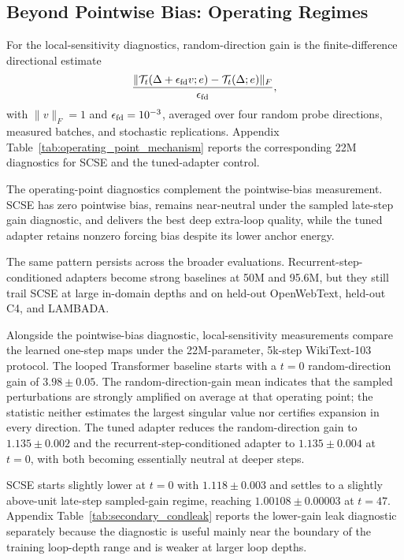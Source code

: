 \documentclass[letterpaper]{article} %
\newcommand{\SCSE}{\textsc{SCSE}}
\newcommand{\norm}[1]{\lVert#1\rVert}
\newcommand{\Tmap}{\mathcal{T}}
\theoremstyle{remark}
\begin{document}
\subsection{Beyond Pointwise Bias: Operating Regimes}
\label{app:after-bias-removal}

For the local-sensitivity diagnostics, random-direction gain is the finite-difference directional estimate
\begin{align*}
	\frac{\norm{\Tmap_t(\Delta+\epsilon_{\rm fd} v;e)-\Tmap_t(\Delta;e)}_F}{\epsilon_{\rm fd}},
\end{align*}
with $\norm{v}_F=1$ and $\epsilon_{\rm fd}=10^{-3}$, averaged over four random probe directions, measured batches, and stochastic replications.  Appendix Table~\ref{tab:operating_point_mechanism} reports the corresponding 22M diagnostics for \SCSE{} and the tuned-adapter control.

The operating-point diagnostics complement the pointwise-bias measurement.  \SCSE{} has zero pointwise bias, remains near-neutral under the sampled late-step gain diagnostic, and delivers the best deep extra-loop quality, while the tuned adapter retains nonzero forcing bias despite its lower anchor energy.

The same pattern persists across the broader evaluations.  Recurrent-step-conditioned adapters become strong baselines at 50M and 95.6M, but they still trail \SCSE{} at large in-domain depths and on held-out OpenWebText, held-out C4, and LAMBADA.

Alongside the pointwise-bias diagnostic, local-sensitivity measurements compare the learned one-step maps under the 22M-parameter, 5k-step WikiText-103 protocol.  The looped Transformer baseline starts with a $t=0$ random-direction gain of $3.98\pm0.05$.  The random-direction-gain mean indicates that the sampled perturbations are strongly amplified on average at that operating point; the statistic neither estimates the largest singular value nor certifies expansion in every direction.  The tuned adapter reduces the random-direction gain to $1.135\pm0.002$ and the recurrent-step-conditioned adapter to $1.135\pm0.004$ at $t=0$, with both becoming essentially neutral at deeper steps.

\SCSE{} starts slightly lower at $t=0$ with $1.118\pm0.003$ and settles to a slightly above-unit late-step sampled-gain regime, reaching $1.00108\pm0.00003$ at $t=47$.  Appendix Table~\ref{tab:secondary_condleak} reports the lower-gain leak diagnostic separately because the diagnostic is useful mainly near the boundary of the training loop-depth range and is weaker at larger loop depths.
\end{document}
